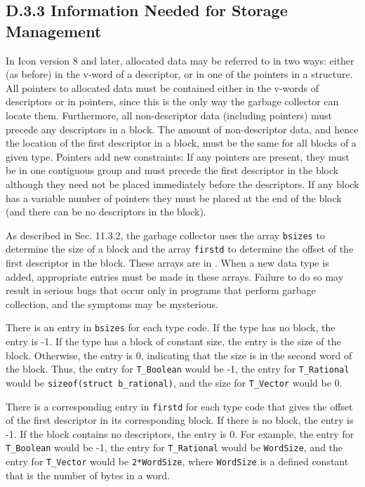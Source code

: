 \subsection%
           {D.3.3 Information Needed for Storage Management}

In Icon version 8 and later, allocated data may be referred to in two ways:
either (as before) in the v-word of a descriptor, or in one of the pointers
in a structure.  All pointers to allocated data must be contained either in
the v-words of descriptors or in pointers, since this is the only way the
garbage collector can locate them. Furthermore, all non-descriptor data
(including pointers) must precede any descriptors in a block. The amount of
non-descriptor data, and hence the location of the first descriptor in a
block, must be the same for all blocks of a given type. Pointers add new
constraints: If any pointers are present, they must be in one contiguous
group and must precede the first descriptor in the block although they need
not be placed immediately before the descriptors.  If any block has a
variable number of pointers they must be placed at the end of the block
(and there can be no descriptors in the block).

As described in Sec. 11.3.2, the garbage collector uses the array
\texttt{bsizes} to determine the size of a block and the array
\texttt{firstd} to determine the offset of the first descriptor in the
block. These arrays are in . When a new data type is
added, appropriate entries must be made in these arrays. Failure to do so
may result in serious bugs that occur only in programs that perform garbage
collection, and the symptoms may be mysterious.

There is an entry in \texttt{bsizes} for each type code. If the type has no
block, the entry is -1. If the type has a block of constant size, the entry
is the size of the block. Otherwise, the entry is 0, indicating that the
size is in the second word of the block. Thus, the entry for
\texttt{T\_Boolean} would be -1, the entry for \texttt{T\_Rational} would
be \texttt{sizeof(struct b\_rational)}, and the size for \texttt{T\_Vector}
would be 0.

There is a corresponding entry in \texttt{firstd} for each type code that
gives the offset of the first descriptor in its corresponding block. If
there is no block, the entry is -1. If the block contains no descriptors,
the entry is 0. For example, the entry for \texttt{T\_Boolean} would be -1,
the entry for \texttt{T\_Rational} would be \texttt{WordSize}, and the
entry for \texttt{T\_Vector} would be \texttt{2*WordSize}, where
\texttt{WordSize} is a defined constant that is the number of bytes in a
word.

